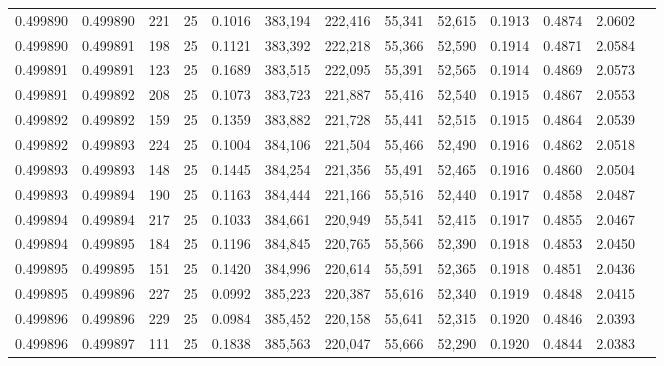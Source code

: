 \begin{tabular}{rrrrrrrrrrrrr}
0.499890 & 0.499890 & 221 &  25 &                                     0.1016 & 383,194 & 222,416 &  55,341 &  52,615 & 0.1913 & 0.4874 & 2.0602 \\
0.499890 & 0.499891 & 198 &  25 &                                     0.1121 & 383,392 & 222,218 &  55,366 &  52,590 & 0.1914 & 0.4871 & 2.0584 \\
0.499891 & 0.499891 & 123 &  25 &                                     0.1689 & 383,515 & 222,095 &  55,391 &  52,565 & 0.1914 & 0.4869 & 2.0573 \\
0.499891 & 0.499892 & 208 &  25 &                                     0.1073 & 383,723 & 221,887 &  55,416 &  52,540 & 0.1915 & 0.4867 & 2.0553 \\
0.499892 & 0.499892 & 159 &  25 &                                     0.1359 & 383,882 & 221,728 &  55,441 &  52,515 & 0.1915 & 0.4864 & 2.0539 \\
0.499892 & 0.499893 & 224 &  25 &                                     0.1004 & 384,106 & 221,504 &  55,466 &  52,490 & 0.1916 & 0.4862 & 2.0518 \\
0.499893 & 0.499893 & 148 &  25 &                                     0.1445 & 384,254 & 221,356 &  55,491 &  52,465 & 0.1916 & 0.4860 & 2.0504 \\
0.499893 & 0.499894 & 190 &  25 &                                     0.1163 & 384,444 & 221,166 &  55,516 &  52,440 & 0.1917 & 0.4858 & 2.0487 \\
0.499894 & 0.499894 & 217 &  25 &                                     0.1033 & 384,661 & 220,949 &  55,541 &  52,415 & 0.1917 & 0.4855 & 2.0467 \\
0.499894 & 0.499895 & 184 &  25 &                                     0.1196 & 384,845 & 220,765 &  55,566 &  52,390 & 0.1918 & 0.4853 & 2.0450 \\
0.499895 & 0.499895 & 151 &  25 &                                     0.1420 & 384,996 & 220,614 &  55,591 &  52,365 & 0.1918 & 0.4851 & 2.0436 \\
0.499895 & 0.499896 & 227 &  25 &                                     0.0992 & 385,223 & 220,387 &  55,616 &  52,340 & 0.1919 & 0.4848 & 2.0415 \\
0.499896 & 0.499896 & 229 &  25 &                                     0.0984 & 385,452 & 220,158 &  55,641 &  52,315 & 0.1920 & 0.4846 & 2.0393 \\
0.499896 & 0.499897 & 111 &  25 &                                     0.1838 & 385,563 & 220,047 &  55,666 &  52,290 & 0.1920 & 0.4844 & 2.0383 \\

\end{tabular}
